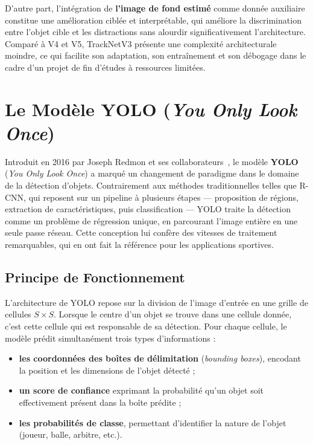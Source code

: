 \begin{itemize}
D'autre part, l'intégration de \textbf{l'image de fond estimé} comme donnée
auxiliaire constitue une amélioration ciblée et interprétable, qui améliore la
discrimination entre l'objet cible et les distractions sans alourdir
significativement l'architecture. Comparé à V4 et V5, TrackNetV3 présente une
complexité architecturale moindre, ce qui facilite son adaptation, son entraînement
et son débogage dans le cadre d'un projet de fin d'études à ressources limitées.

\section{Le Modèle YOLO (\textit{You Only Look Once})}

Introduit en 2016 par Joseph Redmon et ses collaborateurs~\cite{yolo_v1}, le modèle
\textbf{YOLO} (\textit{You Only Look Once}) a marqué un changement de paradigme
dans le domaine de la détection d'objets. Contrairement aux méthodes
traditionnelles telles que R-CNN, qui reposent sur un pipeline à plusieurs étapes
— proposition de régions, extraction de caractéristiques, puis classification —
YOLO traite la détection comme un problème de régression unique, en parcourant
l'image entière en une seule passe réseau. Cette conception lui confère des vitesses
de traitement  remarquables, qui en ont fait la référence pour les
applications sportives.

\subsection{Principe de Fonctionnement}

L'architecture de YOLO repose sur la division de l'image d'entrée en une grille de
cellules $S \times S$. Lorsque le centre d'un objet se trouve dans une cellule
donnée, c'est cette cellule qui est responsable de sa détection. Pour chaque
cellule, le modèle prédit simultanément trois types d'informations :

\begin{itemize}[leftmargin=1.5em]
  \item \textbf{les coordonnées des boîtes de délimitation} (\textit{bounding
        boxes}), encodant la position et les dimensions de l'objet détecté ;
  \item \textbf{un score de confiance} exprimant la probabilité qu'un objet soit
        effectivement présent dans la boîte prédite ;
  \item \textbf{les probabilités de classe}, permettant d'identifier la nature de
        l'objet (joueur, balle, arbitre, etc.).
\end{itemize}


\end{itemize}
